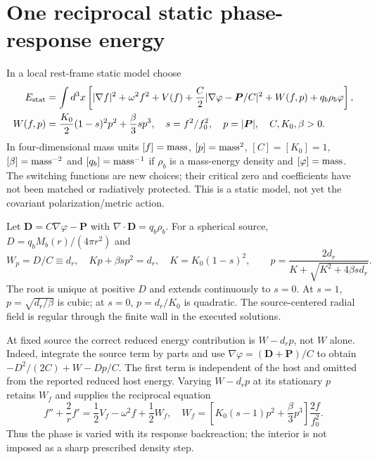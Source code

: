 \documentclass[11pt]{article}
\begin{document}
\section{One reciprocal static phase-response energy}
In a local rest-frame static model choose
\begin{align}
 E_{\rm stat}&=\int d^3x\left[
 |\nabla f|^2+\omega^2 f^2+V(f)
 +\frac C2|\nabla\varphi-\boldsymbol P/C|^2
 +W(f,p)+q_b\rho_b\varphi\right],\\
 W(f,p)&=\frac{K_0}{2}(1-s)^2p^2+\frac\beta3s p^3,
 \quad s=f^2/f_0^2,\quad p=|\boldsymbol P|,
 \quad C,K_0,\beta>0.
 \label{pi:energy}
\end{align}
In four-dimensional mass units $[f]={\rm mass}$, $[p]={\rm mass}^2$,
$[C]=[K_0]=1$, $[\beta]={\rm mass}^{-2}$ and $[q_b]={\rm mass}^{-1}$
if $\rho_b$ is a mass-energy density and $[\varphi]={\rm mass}$.
The switching functions are new choices; their critical zero and coefficients
have not been matched or radiatively protected. This is a static model,
not yet the covariant polarization/metric action.

Let $\boldsymbol D=C\nabla\varphi-\boldsymbol P$ with
$\nabla\cdot\boldsymbol D=q_b\rho_b$. For a spherical source,
$D=q_b M_b(r)/(4\pi r^2)$ and
\begin{equation}
 W_p=D/C\equiv d_r,\quad
 Kp+\beta s p^2=d_r,\quad K=K_0(1-s)^2,\qquad
 p=\frac{2d_r}{K+\sqrt{K^2+4\beta s d_r}}.
 \label{pi:root}
\end{equation}
The root is unique at positive $D$ and extends continuously to $s=0$.
At $s=1$, $p=\sqrt{d_r/\beta}$ is cubic; at $s=0$,
$p=d_r/K_0$ is quadratic. The source-centered radial field is regular
through the finite wall in the executed solutions.

At fixed source the correct reduced energy contribution is
$W-d_rp$, not $W$ alone. Indeed, integrate the source term by parts and
use $\nabla\varphi=(\boldsymbol D+\boldsymbol P)/C$ to obtain
$-D^2/(2C)+W-Dp/C$. The first term is independent of the host and omitted
from the reported reduced host energy. Varying $W-d_rp$ at its stationary
$p$ retains $W_f$ and supplies the reciprocal equation
\begin{equation}
 f''+\frac2r f'=\frac12 V_f-\omega^2f+\frac12 W_f,
 \quad
 W_f=\left[K_0(s-1)p^2+\frac\beta3p^3\right]\frac{2f}{f_0^2}.
 \label{pi:bvp}
\end{equation}
Thus the phase is varied with its response backreaction; the interior
is not imposed as a sharp prescribed density step.
\end{document}
